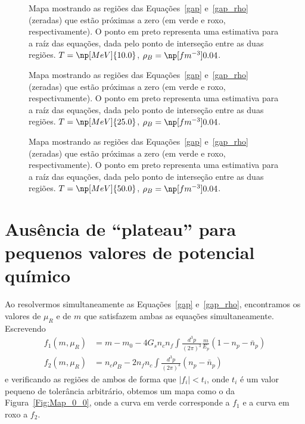 \begin{figure}
	
	\caption{Mapa mostrando as regiões das Equações~\ref{gap} e~\ref{gap_rho} (zeradas) que estão próximas a zero (em verde e roxo, respectivamente). O ponto em preto representa uma estimativa para a raíz das equações, dada pelo ponto de interseção entre as duas regiões.  $T = \np[MeV]{10.0}$, $\rho_B = \np[fm^{-3}]{0.04}$.\protect}
	\label{Fig:Map_3_0}
\end{figure}

\begin{figure}
	
	\caption{Mapa mostrando as regiões das Equações~\ref{gap} e~\ref{gap_rho} (zeradas) que estão próximas a zero (em verde e roxo, respectivamente). O ponto em preto representa uma estimativa para a raíz das equações, dada pelo ponto de interseção entre as duas regiões. $T = \np[MeV]{25.0}$, $\rho_B = \np[fm^{-3}]{0.04}$. \protect}
	\label{Fig:Map_6_0}
\end{figure}

\begin{figure}
	
	\caption{Mapa mostrando as regiões das Equações~\ref{gap} e~\ref{gap_rho} (zeradas) que estão próximas a zero (em verde e roxo, respectivamente). O ponto em preto representa uma estimativa para a raíz das equações, dada pelo ponto de interseção entre as duas regiões.  $T = \np[MeV]{50.0}$, $\rho_B = \np[fm^{-3}]{0.04}$.\protect}
	\label{Fig:Map_9_0}
\end{figure}

\FloatBarrier

\section{Ausência de ``plateau'' para pequenos valores de potencial químico}
\label{Sec:plateau}

Ao resolvermos simultaneamente as Equações~\ref{gap} e~\ref{gap_rho}, encontramos os valores de $\mu_R$ e de $m$ que satisfazem ambas as equações simultaneamente. Escrevendo
\begin{align}
	f_1(m, \mu_R) &= m - m_0 - 4G_s n_c n_f \int\frac{d^3p}{(2\pi)^3} \frac{m}{E_p}(1 - n_p - \bar{n}_p) \\
	f_2(m, \mu_R) &= n_c\rho_B - 2 n_fn_c\int\frac{d^3p}{(2\pi)^3}(n_p - \bar{n}_p)
\end{align}
%
e verificando as regiões de ambos de forma que $|f_i| < t_i$, onde $t_i$ é um valor pequeno de tolerância arbitrário, obtemos um mapa como o da Figura~\ref{Fig:Map_0_0}, onde a curva em verde corresponde a $f_1$ e a curva em roxo a $f_2$.

